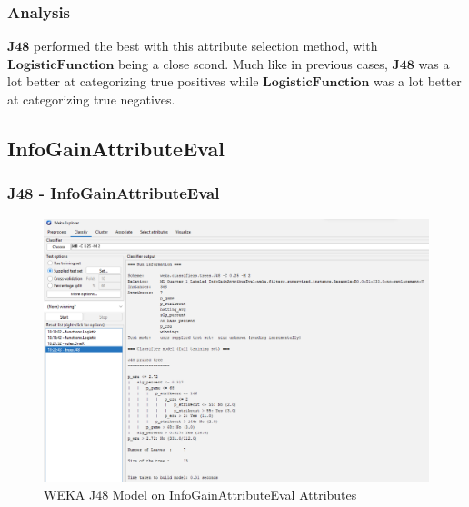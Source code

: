 \documentclass[12pt]{article}
\begin{document}
\newpage
\subsubsection{Analysis}
$\textbf{J48}$ performed the best with this attribute selection method, with $\textbf{LogisticFunction}$ being a close scond. Much like in previous cases, $\textbf{J48}$ was a lot better at categorizing true positives while $\textbf{LogisticFunction}$ was a lot better at categorizing true negatives. 

\newpage
\subsection{InfoGainAttributeEval}

\subsubsection{J48 - InfoGainAttributeEval}
\begin{figure}[h!]
    \includegraphics[scale=0.4]{./images/InfoGainAttributeEval/J48-Model.png}
\centering
    \caption{WEKA J48 Model on InfoGainAttributeEval Attributes}
\end{figure}
\newpage
\end{document}
